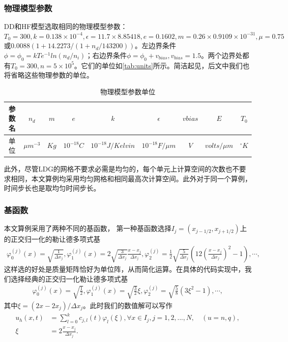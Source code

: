 \subsubsection{物理模型参数}
DD和HF模型选取相同的物理模型参数：$T_0 = 300, k = 0.138 \times 10^{-4}, \epsilon = 11.7\times 8.85418, e = 0.1602, m = 0.26\times0.9109\times 10^{-31}, \mu = 0.75 $或$0.0088(1+14.2273/(1+n_d/143200))$。左边界条件$\phi=\phi_0=kTe^{-1}ln(n_d/n_i)$；右边界条件$\phi = \phi_0+v_{bias}, v_{bias}=1.5$。两个边界处都有$T_0 = 300, n = 5\times 10^5$。它们的单位如\autoref{tab:units}所示\cite{cercignani2000deviceb}。简洁起见，后文中我们也将省略这些物理参数的单位。
\begin{table}[htbp]
    \centering
    \begin{tabular}{ccccccccc}
        \hline
        参数名 & $n_d$        & $m$  & $e$         & $k$                & $\epsilon$        & $vbias$ & $E$           & $T_0$      \\
        \hline
        单位   & $\mu m^{-3}$ & $Kg$ & $10^{-18}C$ & $10^{-18}J/Kelvin$ & $10^{-18}F/\mu m$ & $V$     & $volts/\mu m$ & $^\circ K$ \\
        \hline
    \end{tabular}
    \caption{物理模型参数单位}
    \label{tab:units}
\end{table}
此外，尽管LDG的网格不要求必需是均匀的，每个单元上计算空间的次数也不要求相同，本文算例均采用均匀网格和相同最高次计算空间。此外对于同一个算例，时间步长也是取均匀时间步长。
\subsubsection{基函数}
本文算例采用了两种不同的基函数，
第一种基函数选择$I_j = (x_{j-1/2}, x_{j+1/2})$上的正交归一化的勒让德多项式基
\begin{align*}
    \varphi_0^{(j)}(x) = \sqrt{\frac{1}{\Delta x_j}}, \varphi_1^{(j)}(x) = 2\sqrt{\frac{3}{\Delta x_j}}\frac{x-x_j}{\Delta x_j}, \varphi_2^{(j)} =\frac{1}{2}\sqrt{\frac{5}{\Delta x_j}}(12(\frac{x-x_j}{\Delta x_j})^2 - 1 ), \cdots,
\end{align*}
这样选的好处是质量矩阵恰好为单位阵，从而简化运算。在具体的代码实现中，我们选择经典的正交归一化勒让德多项式基
\begin{align*}
    \varphi_0^{(j)}(x) = \sqrt{\frac{1}{2}}, \varphi_1^{(j)}(x) = \sqrt{\frac{3}{2}}\xi, \varphi_2^{(j)} =\sqrt{\frac{5}{8}}(3\xi^2- 1 ), \cdots,
\end{align*}
其中$\xi = (2x-2x_j)/\Delta x_j$。此时我们的数值解可以写作
\begin{align*}
    u_h(x,t) & = \sum_{l=0}^k c_{j,l}(t)\varphi_{l}(\xi), \forall x \in I_j , j= 1,2,...,N, \quad (u = n,q), \\
    \xi      & = 2\frac{x-x_j}{\Delta x_j}.
\end{align*}

